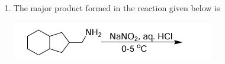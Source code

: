 \documentclass[journal,12pt,onecolumn]{IEEEtran}
\theoremstyle{remark}
\begin{document}
\begin{enumerate}
\begin{enumerate}
        \hfill{}
    \end{enumerate}



\item The major product formed in the reaction given below is
    \begin{center}
     
        \includegraphics[width=0.5\columnwidth]{figs/q30.png}
    \end{center}
    \begin{enumerate}
        \begin{multicols}{2}
       

\end{multicols}
\end{enumerate}
\end{enumerate}
\end{document}
